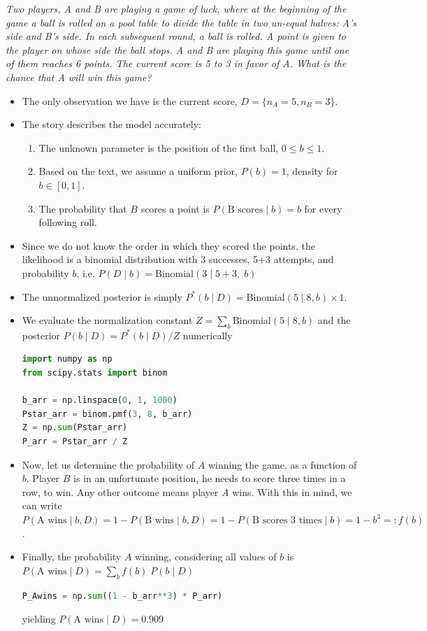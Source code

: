 \emph{Two players, A and B are playing a game of luck, where at the beginning of the game a ball is rolled on a pool table to divide the table in two un-equal halves: A's side and B's side. In each subsequent round, a ball is rolled. A point is given to the player on whose side the ball stops. A and B are playing this game until one of them reaches 6 points. The current score is 5 to 3 in favor of A. What is the chance that A will win this game?}
\begin{itemize}
	\item The only observation we have is the current score, $D = \{n_A = 5, n_B = 3\}$.
	\item The story describes the model accurately:
	\begin{enumerate}
		\item The unknown parameter is the position of the first ball, $0\leq b \leq 1$. 
		\item Based on the text, we assume a uniform prior, $P(b) = 1$, density for $b \in [0,1]$.
		\item The probability that $B$ scores a point is $P(\text{B scores}\;|\;b) = b$ for every following roll.
	\end{enumerate}
	\item Since we do not know the order in which they scored the points, the likelihood is a binomial distribution with 3 successes, 5+3 attempts, and probability $b$, i.e. $P(D\;|\;b) = \text{Binomial}(3\;|\;5 + 3, \;b)$
	\item The unnormalized posterior is simply $P^\ast(b\;|\;D) = \text{Binomial}(5\;|\; 8, b) \times 1$.
	\item We evaluate the normalization constant $Z = \sum_{b} \text{Binomial}(5\;|\; 8, b)$ and the posterior $P(b\;|\;D) = P^\ast(b\;|\;D) / Z$ numerically
\begin{lstlisting}[language=python]
import numpy as np
from scipy.stats import binom

b_arr = np.linspace(0, 1, 1000)
Pstar_arr = binom.pmf(3, 8, b_arr)
Z = np.sum(Pstar_arr)
P_arr = Pstar_arr / Z
\end{lstlisting}
	\item Now, let us determine the probability of $A$ winning the game, as a function of $b$. Player $B$ is in an unfortunate position, he needs to score three times in a row, to win. Any other outcome means player $A$ wins. With this in mind, we can write $P(\text{A wins}\;|\;b, D) = 1 - P(\text{B wins}\;|\;b, D) = 1 - P(\text{B scores 3 times}\;|\;b) = 1 - b^3 =: f(b)$.
	\item Finally, the probability $A$ winning, considering all values of $b$ is $P(\text{A wins}\;|\;D) = \sum_{b} f(b) \;P(b\;|\;D)$
\begin{lstlisting}[language=python]
P_Awins = np.sum((1 - b_arr**3) * P_arr)
\end{lstlisting}
	yielding $P(\text{A wins}\;|\;D) = 0.909$
\end{itemize}





